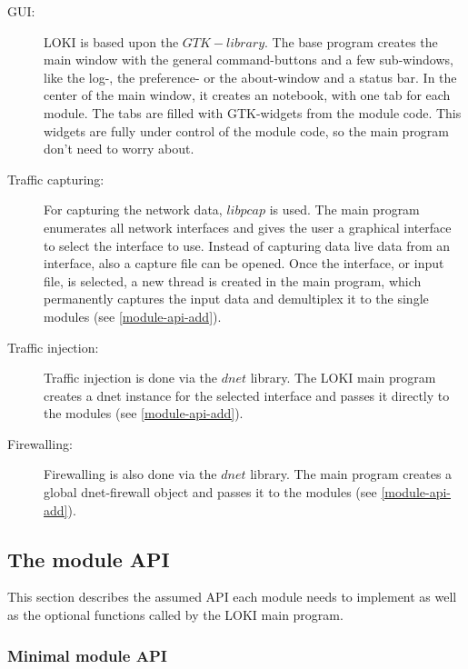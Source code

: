 \documentclass[a4paper, 11pt]{article}
\begin{document}
        \begin{description}
            \item[GUI:] LOKI is based upon the $GTK-library$. The base program creates the main window with the general command-buttons and a few sub-windows, like the log-, the preference- or the about-window and a status bar. In the center of the main window, it creates an notebook, with one tab for each module. The tabs are filled with GTK-widgets from the module code. This widgets are fully under control of the module code, so the main program don't need to worry about.
            \item[Traffic capturing:] For capturing the network data, $libpcap$ is used. The main program enumerates all network interfaces and gives the user a graphical interface to select the interface to use. Instead of capturing data live data from an interface, also a capture file can be opened. Once the interface, or input file, is selected, a new thread is created in the main program, which permanently captures the input data and demultiplex it to the single modules (see \ref{module-api-add}).
            \item[Traffic injection:] Traffic injection is done via the $dnet$ library. The LOKI main program creates a dnet instance for the selected interface and passes it directly to the modules (see \ref{module-api-add}).
            \item[Firewalling:] Firewalling is also done via the $dnet$ library. The main program creates a global dnet-firewall object and passes it to the modules (see \ref{module-api-add}).
        \end{description}

        \subsection{The module API}
        This section describes the assumed API each module needs to implement as well as the optional functions called by the LOKI main program.

            \subsubsection{Minimal module API}
\end{document}
